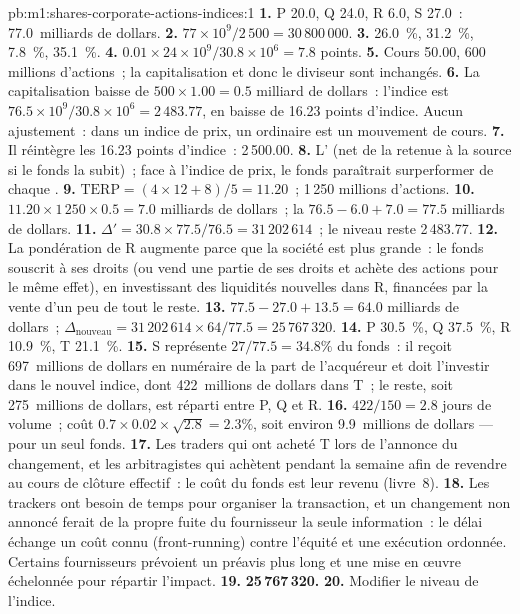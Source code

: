 \begin{solution}{pb:m1:shares-corporate-actions-indices:1}
\textbf{1.} P 20.0, Q 24.0, R 6.0, S 27.0~: 77.0~milliards de dollars.
\textbf{2.} $77\times10^9/2\,500 = 30\,800\,000$.
\textbf{3.} 26.0~\%, 31.2~\%, 7.8~\%, 35.1~\%.
\textbf{4.} $0.01 \times 24\times10^9/30.8\times10^6 = 7.8$ points.
\textbf{5.} Cours 50.00, 600 millions d'actions~; la capitalisation et donc
le diviseur sont inchangés.
\textbf{6.} La capitalisation baisse de $500 \times 1.00 = 0.5$ milliard de dollars~: l'indice
est $76.5\times10^9/30.8\times10^6 = 2\,483.77$, en baisse de 16.23 points d'indice. Aucun
ajustement~: dans un indice de prix, un  ordinaire est un mouvement de cours.
\textbf{7.} Il réintègre les 16.23 points d'indice~: 2\,500.00.
\textbf{8.} L' (net de la retenue à la source si le fonds
la subit)~; face à l'indice de prix, le fonds paraîtrait surperformer de
chaque .
\textbf{9.} $\mathrm{TERP} = (4\times12 + 8)/5 = 11.20$~; 1\,250 millions
d'actions.
\textbf{10.} $11.20 \times 1\,250 \times 0.5 = 7.0$ milliards de dollars~; la  $76.5 - 6.0 + 7.0 = 77.5$ milliards de dollars.
\textbf{11.} $\Delta' = 30.8 \times 77.5/76.5 = 31\,202\,614$~; le niveau
reste 2\,483.77.
\textbf{12.} La pondération de R augmente parce que la société est plus grande~: le fonds
souscrit à ses droits (ou vend une partie de ses droits et achète des actions pour le même
effet), en investissant des liquidités nouvelles dans R, financées par la vente d'un peu de tout
le reste.
\textbf{13.} $77.5 - 27.0 + 13.5 = 64.0$ milliards de dollars~; $\Delta_{\text{nouveau}} = 31\,202\,614
\times 64/77.5 = 25\,767\,320$.
\textbf{14.} P 30.5~\%, Q 37.5~\%, R 10.9~\%, T 21.1~\%.
\textbf{15.} S représente $27/77.5 = 34.8\%$ du fonds~: il reçoit 697~millions de dollars
en numéraire de la part de l'acquéreur et doit l'investir dans le nouvel indice, dont
422~millions de dollars dans T~; le reste, soit 275~millions de dollars, est réparti entre P, Q et R.
\textbf{16.} $422/150 = 2.8$ jours de volume~; coût $0.7\times0.02\times
\sqrt{2.8} = 2.3\%$, soit environ 9.9~millions de dollars --- pour un seul fonds.
\textbf{17.} Les traders qui ont acheté T lors de l'annonce du changement, et
les arbitragistes qui achètent pendant la semaine afin de revendre au
cours de clôture effectif~: le coût du fonds est leur revenu (livre~8).
\textbf{18.} Les trackers ont besoin de temps pour organiser la transaction, et un
changement non annoncé ferait de la propre fuite du fournisseur la seule information~: le délai
échange un coût connu (front-running) contre l'équité et une exécution ordonnée.
Certains fournisseurs prévoient un préavis plus long et une mise en œuvre échelonnée pour répartir
l'impact.
\textbf{19.} \textbf{25\,767\,320.}
\textbf{20.} Modifier le niveau de l'indice.
\end{solution}


